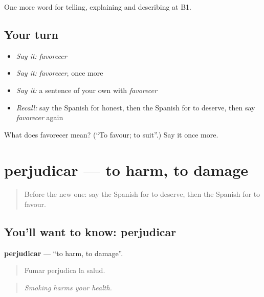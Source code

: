 \begin{grammarlens}[title={What you've built}]
One more word for telling, explaining and describing at B1.
\end{grammarlens}

\subsection*{Your turn}
\begin{itemize}
\raggedright
  \item \emph{Say it:} \emph{favorecer}
  \item \emph{Say it:} \emph{favorecer}, once more
  \item \emph{Say it:} a sentence of your own with \emph{favorecer}
  \item \emph{Recall:} say the Spanish for honest, then the Spanish for to deserve, then say \emph{favorecer} again
\end{itemize}

\begin{tcolorbox}[breakable,colback=teal!4,colframe=teal!35!black,title={Before you move on}]
What does favorecer mean? (\textquotedblleft{}To favour; to suit\textquotedblright{}.) Say it once more.
\end{tcolorbox}
\section[perjudicar]{perjudicar — to harm, to damage}

\label{lesson:ES-C637-perjudicar}



\begin{quote}
Before the new one: say the Spanish for to deserve, then the Spanish for to favour.
\end{quote}

\subsection*{You'll want to know: perjudicar}
\textbf{perjudicar} — \textquotedblleft{}to harm, to damage\textquotedblright{}.

\begin{quote}
Fumar perjudica la salud.
\end{quote}

\begin{quote}
\emph{Smoking harms your health.}
\end{quote}

